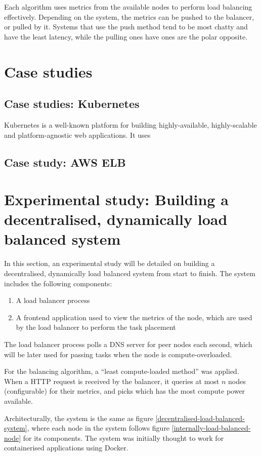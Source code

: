 \documentclass[conference]{IEEEtran}
\begin{document}
    Each algorithm uses metrics from the available nodes to perform load balancing effectively. Depending on the system, the
metrics can be pushed to the balancer, or pulled by it. Systems that use the push method tend to be
most chatty and have the least latency, while the pulling ones have ones are the polar opposite.

\section{Case studies}

\subsection{Case studies: Kubernetes}
    Kubernetes is a well-known platform for building highly-available, highly-scalable and platform-agnostic web applications.
It uses

\subsection{Case study: AWS ELB}

\section{Experimental study: Building a decentralised, dynamically load balanced system}
    In this section, an experimental study will be detailed on building a decentralised, dynamically load balanced system
from start to finish. The system includes the following components:

    \begin{enumerate}
        \item A load balancer process
        \item A frontend application used to view the metrics of the node, which are used by the load balancer
        to perform the task placement
    \end{enumerate}

    The load balancer process polls a DNS server for peer nodes each second, which will be later used for passing tasks
when the node is compute-overloaded.

    For the balancing algorithm, a ``least compute-loaded method'' was applied. When a HTTP request is received by the
balancer, it queries at most $n$ nodes (configurable) for their metrics, and picks which has the most compute power available.

    Architecturally, the system is the same as figure \ref{decentralised-load-balanced-system}, where each node in the system
follows figure \ref{internally-load-balanced-node} for its components. The system was initially thought to work for containerised
applications using Docker.
\end{document}
